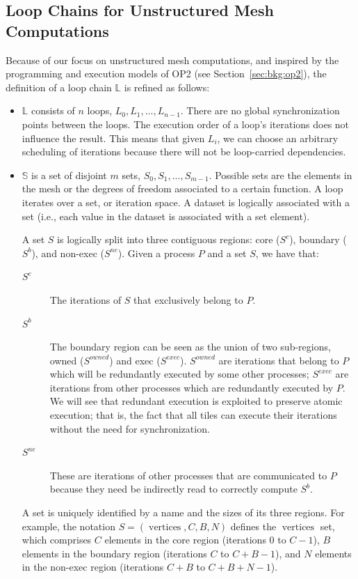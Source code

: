 \subsection{Loop Chains for Unstructured Mesh Computations}
\label{sec:tiling:lc-unstruct}
Because of our focus on unstructured mesh computations, and inspired by the programming and execution models of OP2 (see Section~\ref{sec:bkg:op2}), the definition of a loop chain $\mathbb{L}$ is refined as follows:
\begin{itemize}
\item $\mathbb{L}$ consists of $n$ loops, $L_0, L_1, ..., L_{n-1}$. There are no global synchronization points between the loops. The execution order of a loop's iterations does not influence the result. This means that given $L_i$, we can choose an arbitrary scheduling of iterations because there will not be loop-carried dependencies. 

\item $\mathbb{S}$ is a set of disjoint $m$ sets, $S_0, S_1, ..., S_{m-1}$. Possible sets are the elements in the mesh or the degrees of freedom associated to a certain function. A loop iterates over a set, or iteration space. A dataset is logically associated with a set (i.e., each value in the dataset is associated with a set element). 

A set $S$ is logically split into three contiguous regions: core ($S^{c}$), boundary ($S^{b}$), and non-exec ($S^{ne}$). Given a process $P$ and a set $S$, we have that:
\begin{description}
 \item[$S^{c}$] The iterations of $S$ that exclusively belong to $P$.
 \item[$S^{b}$] The boundary region can be seen as the union of two sub-regions, owned ($S^{owned}$) and exec ($S^{exec}$). $S^{owned}$ are iterations that belong to $P$ which will be redundantly executed by some other processes; $S^{exec}$ are iterations from other processes which are redundantly executed by $P$. We will see that redundant execution is exploited to preserve atomic execution; that is, the fact that all tiles can execute their iterations without the need for synchronization.
  \item[$S^{ne}$] These are iterations of other processes that are communicated to $P$ because they need be indirectly read to correctly compute $S^{b}$.
 \end{description} 
 
A set is uniquely identified by a name and the sizes of its three regions. For example, the notation $S = (\operatorname{vertices}, C, B, N)$ defines the $\operatorname{vertices}$ set, which comprises $C$ elements in the core region (iterations $0$ to $C-1$), $B$ elements in the boundary region (iterations $C$ to $C+B-1$), and $N$ elements in the non-exec region (iterations $C+B$ to $C+B+N-1$).


\end{itemize}

